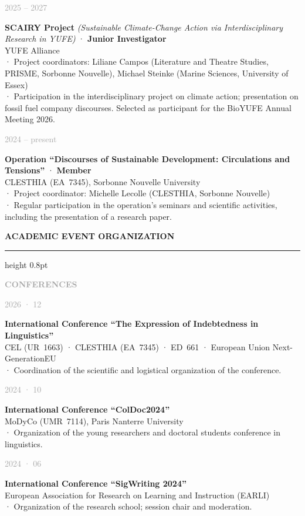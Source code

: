 \documentclass[10.5pt, a4paper]{article}
\newlength{\datecol}
\newlength{\contentcol}
\newcommand{\cvrow}[2]{%
  \noindent
  \parbox[t]{\datecol}{\raggedleft\textcolor{darkgray}{\small #1}}%
  \hspace{1.2em}%
  \parbox[t]{\contentcol}{\sloppy\hbadness=10000 #2}%
  \par\vspace{0.6em}%
}
\newcommand{\cvsection}[1]{%
  \vspace{10pt}%
  {\color{navy}\large\bfseries\MakeUppercase{#1}}%
  \vspace{2pt}%
  {\color{navy}\hrule height 0.8pt}%
  \vspace{6pt}%
}
\newcommand{\cvsubsection}[1]{%
  \vspace{5pt}%
  {\small\bfseries\textcolor{darkgray}{\MakeUppercase{#1}}}%
  \vspace{3pt}\par%
}
\begin{document}
\cvrow{2025 -- 2027}{%
  \textbf{SCAIRY Project}
  \textit{(Sustainable Climate-Change Action via Interdisciplinary Research in YUFE)}
  · \textbf{Junior Investigator}\\
  {\small YUFE Alliance\\
   · Project coordinators: Liliane Campos (Literature and Theatre Studies, PRISME, Sorbonne Nouvelle), Michael Steinke (Marine Sciences, University of Essex)\\
   · Participation in the interdisciplinary project on climate action;
  presentation on fossil fuel company discourses.
  Selected as participant for the BioYUFE Annual Meeting 2026.}}

\cvrow{2024 -- present}{%
  \textbf{Operation ``Discourses of Sustainable Development:
  Circulations and Tensions''}
  · \textbf{Member}\\
  {\small CLESTHIA (EA~7345), Sorbonne Nouvelle University\\
   · Project coordinator: Michelle Lecolle (CLESTHIA, Sorbonne Nouvelle)\\
   · Regular participation in the operation's seminars and scientific activities,
  including the presentation of a research paper.}}

\cvsection{Academic Event Organization}

\cvsubsection{Conferences}

\cvrow{2026 · 12}{%
  \textbf{International Conference
  ``The Expression of Indebtedness in Linguistics''}\\
  {\small CEL (UR~1663) · CLESTHIA (EA~7345) · ED~661
  · European Union Next-GenerationEU\\
   · Coordination of the scientific and logistical organization of the conference.}}

\cvrow{2024 · 10}{%
  \textbf{International Conference ``ColDoc2024''}\\
  {\small MoDyCo (UMR~7114), Paris Nanterre University\\
   · Organization of the young researchers and doctoral students conference in linguistics.}}

\cvrow{2024 · 06}{%
  \textbf{International Conference ``SigWriting 2024''}\\
  {\small European Association for Research on Learning and Instruction (EARLI)\\
   · Organization of the research school; session chair and moderation.}}
\end{document}
